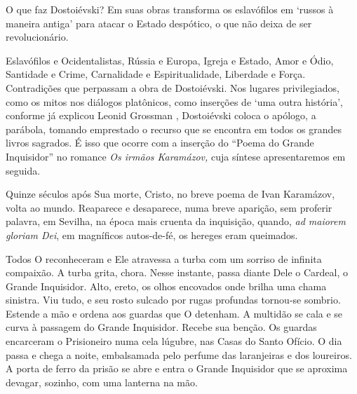 O que faz Dostoiévski? Em suas obras transforma os eslavófilos em
`russos à maneira antiga' para atacar o Estado despótico, o que não
deixa de ser revolucionário.

Eslavófilos e Ocidentalistas, Rússia e Europa, Igreja e Estado, Amor e
Ódio, Santidade e Crime, Carnalidade e Espiritualidade, Liberdade e
Força. Contradições que perpassam a obra de Dostoiévski. Nos lugares
privilegiados, como os mitos nos diálogos platônicos, como inserções de
`uma outra história', conforme já explicou Leonid Grossman , Dostoiévski
coloca o apólogo, a parábola, tomando emprestado o recurso que se
encontra em todos os grandes livros sagrados. É isso que ocorre com a
inserção do ``Poema do Grande Inquisidor'' no romance \emph{Os irmãos
Karamázov,} cuja síntese apresentaremos em seguida.

Quinze séculos após Sua morte, Cristo, no breve poema de Ivan Karamázov,
volta ao mundo. Reaparece e desaparece, numa breve aparição, sem
proferir palavra, em Sevilha, na época mais cruenta da inquisição,
quando, \emph{ad maiorem gloriam Dei}, em magníficos autos-de-fé, os
hereges eram queimados.

Todos O reconheceram e Ele atravessa a turba com um sorriso de infinita
compaixão. A turba grita, chora. Nesse instante, passa diante Dele o
Cardeal, o Grande Inquisidor. Alto, ereto, os olhos encovados onde
brilha uma chama sinistra. Viu tudo, e seu rosto sulcado por rugas
profundas tornou-se sombrio. Estende a mão e ordena aos guardas que O
detenham. A multidão se cala e se curva à passagem do Grande Inquisidor.
Recebe sua benção. Os guardas encarceram o Prisioneiro numa cela
lúgubre, nas Casas do Santo Ofício. O dia passa e chega a noite,
embalsamada pelo perfume das laranjeiras e dos loureiros. A porta de
ferro da prisão se abre e entra o Grande Inquisidor que se aproxima
devagar, sozinho, com uma lanterna na mão.

